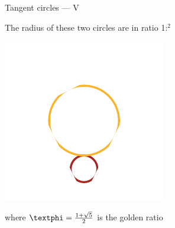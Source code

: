 \documentclass[14pt]{beamer}
\begin{document}

    \begin{frame}{Tangent circles --- V}
        \begin{center}
            The radius of these two circles are in ratio 1:\textphi$^2$
        \end{center}\medskip
        \hspace{6.18em} \includegraphics[scale=1.0]{figures/figure019i.pdf} \\
        \begin{center}
             where $\text{\textphi} =\tfrac{1+\sqrt{5}}{2}$ is the golden ratio
        \end{center}
    \end{frame}

\end{document}
